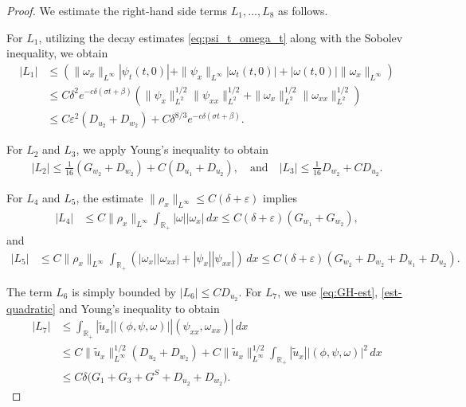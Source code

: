 \documentclass[11pt,reqno]{amsart}
\numberwithin{equation}{section} %
\begin{document}
\begin{proof}
We estimate the right-hand side terms $L_1, \dots, L_8$ as follows. 

For $L_1$, utilizing the decay estimates \eqref{eq:psi_t_omega_t} along with the Sobolev inequality, we obtain
\begin{equation*}
\begin{aligned}
|L_1| &\le   \left( \| \omega_x\|_{L^\infty} |\psi_t(t,0)|  + \| \psi_x\|_{L^\infty} | \omega_t(t,0)|+ |\omega(t,0)| \|\omega_x\|_{L^\infty}\right)  \\
&\le C  \delta^2 e^{-c \delta (\sigma t +\beta)}\left( \|\psi_x\|_{L^2}^{1/2}  \|\psi_{xx}\|_{L^2}^{1/2} + \|\omega_x\|_{L^2}^{1/2} \|\omega_{xx}\|_{L^2}^{1/2} \right) \\
&\le C \varepsilon^2 \left( D_{u_2}  + D_{w_2} \right)  + C \delta^{8/3} e^{-c\delta(\sigma t+\beta)}.
\end{aligned}
\end{equation*}

For $L_2$ and $L_3$, we apply Young's inequality to obtain
\begin{equation*}
\begin{aligned}
|L_2| \le \frac{1}{16} (G_{w_2} + D_{w_2})  + C ( D_{u_1} + D_{u_2}),\quad\mbox{and}\quad |L_3| \le  \frac{1}{16}  D_{w_2}  + C  D_{u_2}.
\end{aligned}
\end{equation*}

For $L_4$ and $L_5$, the estimate $\|\rho_x\|_{L^\infty} \le C(\delta + \varepsilon)$ implies
\begin{equation*}
\begin{aligned}
|L_4| &\le C \|\rho_x\|_{L^\infty} \int_{\mathbb{R}_+} |\omega| |\omega_x| \, dx \le  C(\delta + \varepsilon) \left( G_{w_1} + G_{w_2} \right),
\end{aligned}
\end{equation*}
and 
\begin{equation*}
\begin{aligned}
|L_5| &\le C \|\rho_x\|_{L^\infty} \int_{\mathbb{R}_+} (|\omega_x| |\omega_{xx}| + |\psi_x| |\psi_{xx}| ) \, dx \le  C(\delta + \varepsilon) \left( G_{w_2} + D_{w_2} + D_{u_1} + D_{u_2}\right).
\end{aligned}
\end{equation*}

The term $L_6$ is simply bounded by $|L_6| \le C D_{u_2}$. For $L_7$, we use \eqref{eq:GH-est}, \eqref{est-quadratic} and Young's inequality to obtain
\begin{equation*}
\begin{aligned}
|L_7| &\le \int_{\mathbb{R}_+}  |\tilde{u}_x| |(\phi,\psi,\omega)| |(\psi_{xx},\omega_{xx})| \, dx \\
&\le C\|\tilde{u}_x\|_{L^\infty}^{1/2} ( D_{u_2} +  D_{w_2} )+ C \|\tilde{u}_x\|_{L^\infty}^{1/2} \int_{\mathbb{R}_+} |\tilde{u}_x| |(\phi,\psi,\omega)|^2 \, dx \\
&\le  C \delta \bigl( G_1+G_3 + G^S + D_{u_2} + D_{w_2} \bigr).
\end{aligned}
\end{equation*}


\end{proof}
\end{document}
